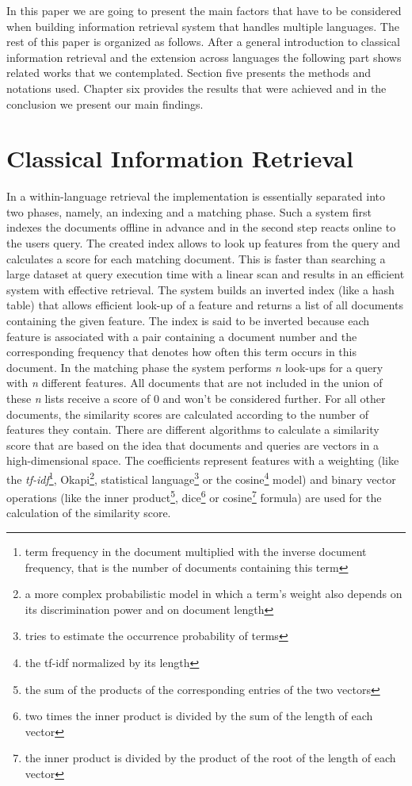 \documentclass[journal]{IEEEtran}
\begin{document}
In this paper we are going to present the main factors that have to be considered when building information retrieval system that handles multiple languages.
The rest of this paper is organized as follows.
After a general introduction to classical information retrieval and the extension across languages the following part shows related works that we contemplated.
Section five presents the methods and notations used.
Chapter six provides the results that were achieved and in the conclusion we present our main findings.



\section{Classical Information Retrieval}
In a within-language retrieval the implementation is essentially separated into two phases, namely, an indexing and a matching phase.
Such a system first indexes the documents offline in advance and in the second step reacts online to the users query.
The created index allows to look up features from the query and calculates a score for each matching document.
This is faster than searching a large dataset at query execution time with a linear scan and results in an efficient system with effective retrieval.
The system builds an inverted index (like a hash table) that allows efficient look-up of a feature and returns a list of all documents containing the given feature.
The index is said to be inverted because each feature is associated with a pair containing a document number and the corresponding frequency that denotes how often this term occurs in this document.
In the matching phase the system performs \textit{n} look-ups for a query with \textit{n} different features.
All documents that are not included in the union of these \textit{n} lists receive a score of 0 and won't be considered further.
For all other documents, the similarity scores are calculated according to the number of features they contain.
There are different algorithms to calculate a similarity score that are based on the idea that documents and queries are vectors in a high-dimensional space.
The coefficients represent features with a weighting (like the \textit{tf-idf}\footnote{term frequency in the document multiplied with the inverse document frequency, that is the number of documents containing this term}, Okapi\footnote{a more complex probabilistic model in which a term's weight also depends on its discrimination power and on document length}, statistical language\footnote{tries to estimate the occurrence probability of terms} or the cosine\footnote{the tf-idf normalized by its length} model) and binary vector operations (like the inner product\footnote{the sum of the products of the corresponding entries of the two vectors}, dice\footnote{two times the inner product is divided by the sum of the length of each vector} or cosine\footnote{the inner product is divided by the product of the root of the length of each vector} formula) are used for the calculation of the similarity score.
\end{document}
